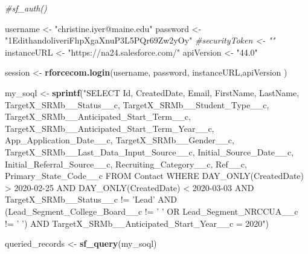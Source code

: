 \documentclass[
]{article}
\newenvironment{Shaded}{\begin{snugshade}}{\end{snugshade}}
\newcommand{\CommentTok}[1]{\textcolor[rgb]{0.56,0.35,0.01}{\textit{#1}}}
\newcommand{\KeywordTok}[1]{\textcolor[rgb]{0.13,0.29,0.53}{\textbf{#1}}}
\newcommand{\NormalTok}[1]{#1}
\newcommand{\StringTok}[1]{\textcolor[rgb]{0.31,0.60,0.02}{#1}}
\begin{document}
\begin{Shaded}
\begin{Highlighting}[]
\CommentTok{#sf_auth()}
\end{Highlighting}
\end{Shaded}

\begin{Shaded}
\begin{Highlighting}[]
\NormalTok{username <-}\StringTok{ "christine.iyer@maine.edu"}
\NormalTok{password <-}\StringTok{ "1EdithandoliveriFhpXgaXnuP3L5PQr69Zw2yOy"}
\CommentTok{#securityToken <- ""}
\NormalTok{instanceURL <-}\StringTok{ "https://na24.salesforce.com/"}
\NormalTok{apiVersion <-}\StringTok{ "44.0"}





\NormalTok{session <-}\StringTok{ }\KeywordTok{rforcecom.login}\NormalTok{(username, password, instanceURL,apiVersion  ) }
\end{Highlighting}
\end{Shaded}

\begin{Shaded}
\begin{Highlighting}[]
\NormalTok{my_soql <-}\StringTok{ }\KeywordTok{sprintf}\NormalTok{(}\StringTok{"SELECT Id,}
\StringTok{                           CreatedDate,}
\StringTok{                           Email, }
\StringTok{                           FirstName, }
\StringTok{                           LastName,}
\StringTok{                           TargetX_SRMb__Status__c, TargetX_SRMb__Student_Type__c,}
\StringTok{                           TargetX_SRMb__Anticipated_Start_Term__c,}
\StringTok{                           TargetX_SRMb__Anticipated_Start_Term_Year__c, }
\StringTok{                           App_Application_Date__c,  }
\StringTok{                           TargetX_SRMb__Gender__c,  }
\StringTok{                           TargetX_SRMb__Last_Data_Input_Source__c,                                                                Initial_Source_Date__c, }
\StringTok{                           Initial_Referral_Source__c, }
\StringTok{                           Recruiting_Category__c,}
\StringTok{                           Ref__c, }
\StringTok{                           Primary_State_Code__c}
\StringTok{                           }
\StringTok{                    FROM Contact }
\StringTok{                    WHERE DAY_ONLY(CreatedDate) > 2020-02-25 }
\StringTok{                    AND DAY_ONLY(CreatedDate) < 2020-03-03 }
\StringTok{                    AND TargetX_SRMb__Status__c != 'Lead' }
\StringTok{                    AND (Lead_Segment_College_Board__c != ' ' }
\StringTok{                    OR  Lead_Segment_NRCCUA__c  != ' ') }
\StringTok{                    AND TargetX_SRMb__Anticipated_Start_Year__c = 2020"}\NormalTok{)}

\NormalTok{queried_records <-}\StringTok{ }\KeywordTok{sf_query}\NormalTok{(my_soql)}
\end{Highlighting}
\end{Shaded}
\end{document}
